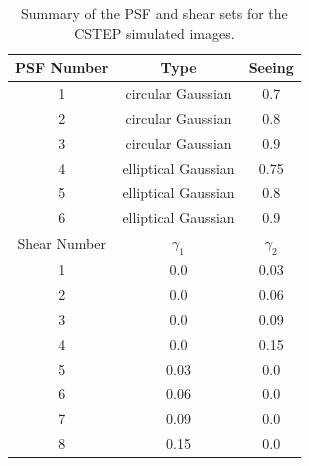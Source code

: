 \begin{table}
\begin{centering}
\begin{tabular}{ccc}
\hline
PSF Number & Type & Seeing  \\
\hline
1 & circular Gaussian & 0.7 \\
2 & circular Gaussian & 0.8 \\
3 & circular Gaussian & 0.9 \\
4 & elliptical Gaussian & 0.75 \\
5 & elliptical Gaussian & 0.8  \\
6 & elliptical Gaussian & 0.9  \\
\hline
\hline
Shear Number & $ \gamma_1 $ & $ \gamma_2 $  \\
\hline
1 &  0.0 & 0.03 \\
2 &  0.0 & 0.06 \\
3 &  0.0 & 0.09 \\
4 &  0.0 & 0.15 \\
5 &  0.03 & 0.0 \\
6 &  0.06 & 0.0 \\
7 &  0.09 & 0.0 \\
8 &  0.15 & 0.0 \\
\hline
\end{tabular}
\end{centering}
\caption{ Summary of the PSF and shear sets for the CSTEP simulated images. }
\label{table:tab2}
\end{table}

